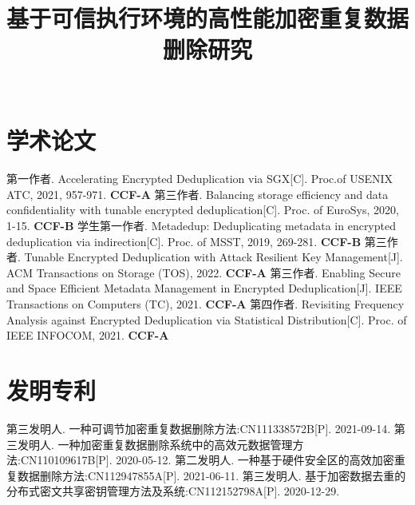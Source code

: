 \documentclass[master]{thesis-uestc}
\title{基于可信执行环境的高性能加密重复数据删除研究}{High-Performance Encrypted Data Deduplication System Based on Trusted Execution Environment}
\author{$\quad$}{$\quad$}
\begin{document}
\makecover
\originalitydeclaration



\thesistableofcontents
\thesisglossarylist







\thesisacknowledgement



\thesisappendix


\begin{thesistheaccomplish}
    \section{学术论文}
     第一作者. Accelerating Encrypted Deduplication via SGX[C]. Proc.of USENIX ATC, 2021, 957-971. \textbf{CCF-A}
     第三作者. Balancing storage efficiency and data confidentiality with tunable encrypted deduplication[C]. Proc. of EuroSys, 2020, 1-15. \textbf{CCF-B}
     学生第一作者. Metadedup: Deduplicating metadata in encrypted deduplication via indirection[C]. Proc. of MSST, 2019, 269-281. \textbf{CCF-B}
     第三作者. Tunable Encrypted Deduplication with Attack Resilient Key Management[J]. ACM Transactions on Storage (TOS), 2022. \textbf{CCF-A}
     第三作者. Enabling Secure and Space Efficient Metadata Management in Encrypted Deduplication[J]. IEEE Transactions on Computers (TC), 2021. \textbf{CCF-A}
     第四作者. Revisiting Frequency Analysis against Encrypted Deduplication via Statistical Distribution[C]. Proc. of IEEE INFOCOM, 2021. \textbf{CCF-A}
    \section{发明专利}
     第三发明人. 一种可调节加密重复数据删除方法:CN111338572B[P]. 2021-09-14.
     第三发明人. 一种加密重复数据删除系统中的高效元数据管理方法:CN110109617B[P]. 2020-05-12.
     第二发明人. 一种基于硬件安全区的高效加密重复数据删除方法:CN112947855A[P]. 2021-06-11.
     第三发明人. 基于加密数据去重的分布式密文共享密钥管理方法及系统:CN112152798A[P]. 2020-12-29.
\end{thesistheaccomplish}
\end{document}
